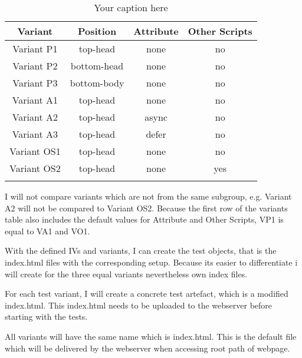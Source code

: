 \begin{center}
	\begin{longtable}{ |c|c|c|c|  }
	\hline
	Variant & Position & Attribute & Other Scripts \\
	\hline
	Variant P1 & top-head & \cellcolor{lightgrey} none & \cellcolor{lightgrey} no \\
	   Variant P2 & bottom-head & \cellcolor{lightgrey} none & \cellcolor{lightgrey} no \\
	   Variant P3 & bottom-body & \cellcolor{lightgrey} none & \cellcolor{lightgrey} no \\
	  \hline
	   Variant A1 & \cellcolor{lightgrey} top-head & none & \cellcolor{lightgrey} no \\
	   Variant A2 & \cellcolor{lightgrey} top-head & async & \cellcolor{lightgrey} no \\
	   Variant A3 & \cellcolor{lightgrey} top-head & defer & \cellcolor{lightgrey} no \\
	  \hline
	  Variant OS1 & \cellcolor{lightgrey} top-head & \cellcolor{lightgrey} none & no \\
	  Variant OS2 & \cellcolor{lightgrey} top-head & \cellcolor{lightgrey} none & yes \\
	  \hline
	\caption{Your caption here} %
	\label{tab:myfirstlongtable}
	\end{longtable}
\end{center}


I will not compare variants which are not from the same subgroup, e.g. Variant A2 will not be compared to Variant OS2.
Because the first row of the variants table also includes the default values for Attribute and Other Scripts, VP1 is equal to VA1 and VO1.

With the defined IVs and variants, I can create the test objects, that is the index.html files with the corresponding setup.
Because its easier to differentiate i will create for the three equal variants nevertheless own index files.

For each test variant, I will create a concrete test artefact, which is a modified index.html.
This index.html needs to be uploaded to the webserver before starting with the tests.

All variants will have the same name which is index.html. This is the default file which will be delivered by the webserver when accessing root path of webpage.





